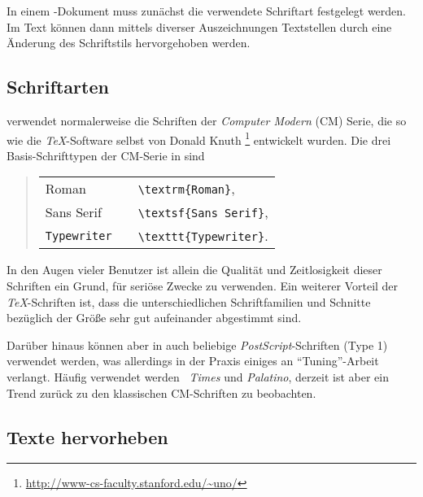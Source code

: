 In einem \latex-Dokument muss zunächst die verwendete Schriftart festgelegt werden. Im Text können dann mittels diverser Auszeichnungen Textstellen durch eine Änderung des Schriftstils hervorgehoben werden.

\subsection{Schriftarten}

\latex verwendet normalerweise die Schriften der \emph{Computer
Modern}
(CM) Serie, die so wie die \emph{TeX}-Software selbst von Donald Knuth%
\footnote{\url{http://www-cs-faculty.stanford.edu/~uno/}} entwickelt
wurden. Die drei Basis-Schrifttypen der CM-Serie in \latex sind
%
\begin{quote}
\begin{tabular}{lcl}
\textrm{Roman}      & & \verb!\textrm{Roman}!,\\
\textsf{Sans Serif} & & \verb!\textsf{Sans Serif}!,\\
\texttt{Typewriter} & & \verb!\texttt{Typewriter}!.\\
\end{tabular}
\end{quote}
%
\noindent In den Augen vieler Benutzer ist allein die Qualität und
Zeitlosigkeit dieser Schriften ein Grund, \latex für seriöse
Zwecke zu verwenden. Ein weiterer Vorteil der \emph{TeX}-Schriften
ist, dass die unterschiedlichen Schriftfamilien und Schnitte
bezüglich der Größe sehr gut aufeinander abgestimmt sind.

Darüber hinaus können aber in \latex auch beliebige 
\emph{PostScript}-Schrif\-ten (Type 1) verwendet werden, was allerdings in
der Praxis einiges an "`Tuning"'-Arbeit verlangt. Häufig verwendet
werden \zB\ \emph{Times} und \emph{Palatino}, derzeit ist aber ein Trend 
zurück zu den klassischen CM-Schriften zu beobachten.



\subsection{Texte hervorheben}

